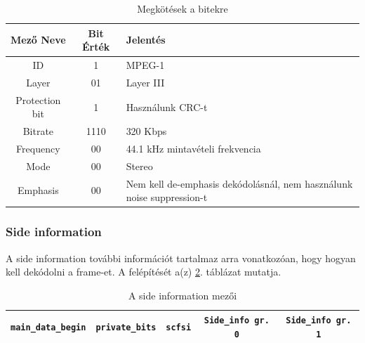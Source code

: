 \documentclass[12pt, a4paper]{article}
\begin{document}
\begin{table}[h]
\centering
\footnotesize
\begin{tabular}{|c|c|p{6cm}|}
  \hline
  \textbf{Mező Neve} & \textbf{Bit Érték} & \textbf{Jelentés} \\
  \hline
   ID & 1 & MPEG-1 \\
  \hline
  Layer & 01 & Layer III \\
  \hline
  Protection bit & 1 & Használunk CRC-t \\
  \hline
  Bitrate & 1110 & 320 Kbps \\
  \hline
  Frequency & 00 & 44.1 kHz mintavételi frekvencia \\
  \hline
  Mode & 00 & Stereo \\
  \hline
  Emphasis & 00 & Nem kell de-emphasis dekódolásnál, nem használunk noise suppression-t \\
  \hline
\end{tabular}
\caption{Megkötések a bitekre}
\label{tab:bit-constraints}
\end{table}

\subsubsection{Side information}

A side information további információt tartalmaz arra vonatkozóan, hogy hogyan kell dekódolni a frame-et. A felépítését a(z) \ref{tab:side-info}. táblázat mutatja.

\begin{table}[h]
\centering
\footnotesize
\begin{tabular}{|c|c|c|c|c|}
  \hline
  \texttt{main\_data\_begin} & \texttt{private\_bits} & \texttt{scfsi} & \texttt{Side\_info gr. 0} & \texttt{Side\_info gr. 1} \\
  \hline
\end{tabular}
\caption{A side information mezői}
\label{tab:side-info}
\end{table}
\end{document}
